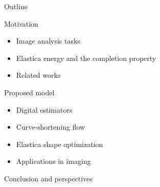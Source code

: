 \begin{frame}{Outline}

\begin{enumerate}
	{
	\item{Motivation}
	\begin{itemize}
		\item{Image analysis tasks}		
		\item{Elastica energy and the completion property}	
		\item{Related works}
	\end{itemize}}
	\vspace{1em}
	\item{Proposed model}
	\begin{itemize}
		\item{Digital estimators}		
		\item{Curve-shortening flow}	
		\item{Elastica shape optimization}
		\item{Applications in imaging}			
	\end{itemize}
	\vspace{1em}
	\item{Conclusion and perspectives}
\end{enumerate}

\end{frame}